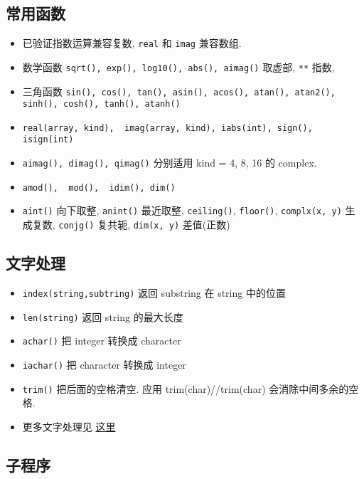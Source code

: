 \subsection{常用函数}
\begin{itemize}
\item 已验证指数运算兼容复数, \verb`real` 和 \verb`imag` 兼容数组.
\item 数学函数 \verb`sqrt(), exp(), log10(), abs(), aimag()` 取虚部, \verb`**` 指数, 
\item 三角函数 \verb`sin(), cos(), tan(), asin(), acos(), atan(), atan2(), sinh(), cosh(), tanh(), atanh()`
\item \verb`real(array, kind),  imag(array, kind), iabs(int), sign(), isign(int)`
\item \verb`aimag(), dimag(), qimag()` 分别适用 kind = 4, 8, 16 的 complex.
\item \verb`amod(),  mod(),  idim(), dim()`
\item \verb`aint()` 向下取整, \verb`anint()` 最近取整, \verb`ceiling()`, \verb`floor()`, \verb`complx(x, y)` 生成复数, \verb`conjg()` 复共轭, \verb`dim(x, y)` 差值(正数)
\end{itemize}

\subsection{文字处理}
\begin{itemize}
\item \verb`index(string,subtring)` 返回 substring 在 string 中的位置
\item \verb`len(string)` 返回 string 的最大长度
\item \verb`achar()` 把 integer 转换成 character
\item \verb`iachar()` 把 character 转换成 integer
\item \verb`trim()` 把后面的空格清空. 应用  trim(char)//trim(char) 会消除中间多余的空格.
\item 更多文字处理见 \href{http://www.tutorialspoint.com/fortran/fortran_characters.htm}{这里}
\end{itemize}

\subsection{子程序}

